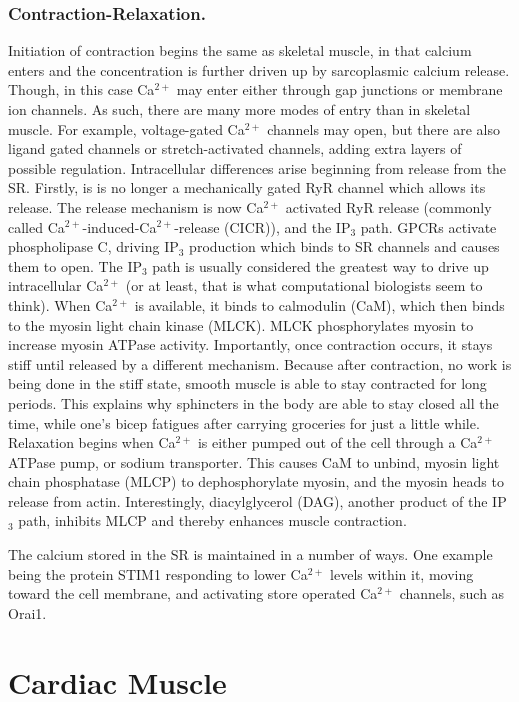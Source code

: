 \documentclass[12pt]{report}
\begin{document}
\subsubsection{Contraction-Relaxation.} 
Initiation of contraction begins the same as skeletal muscle, in that calcium enters and the concentration is further driven up by sarcoplasmic calcium release. Though, in this case Ca$^{2+}$ may enter either through gap junctions or membrane ion channels. As such, there are many more modes of entry than in skeletal muscle. For example, voltage-gated Ca$^{2+}$ channels may open, but there are also ligand gated channels or stretch-activated channels, adding extra layers of possible regulation. Intracellular differences arise beginning from release from the SR. Firstly, is is no longer a mechanically gated RyR channel which allows its release. The release mechanism is now Ca$^{2+}$ activated RyR release (commonly called Ca$^{2+}$-induced-Ca$^{2+}$-release (CICR)), and the IP$_3$ path. GPCRs activate phospholipase C, driving IP$_3$ production which binds to SR channels and causes them to open. The IP$_3$ path is usually considered the greatest way to drive up intracellular Ca$^{2+}$ (or at least, that is what computational biologists seem to think). When Ca$^{2+}$ is available, it binds to calmodulin (CaM), which then binds to the myosin light chain kinase (MLCK). MLCK phosphorylates myosin to increase myosin ATPase activity. Importantly, once contraction occurs, it stays stiff until released by a different mechanism. Because after contraction, no work is being done in the stiff state, smooth muscle is able to stay contracted for long periods. This explains why sphincters in the body are able to stay closed all the time, while one's bicep fatigues after carrying groceries for just a little while. Relaxation begins when Ca$^{2+}$ is either pumped out of the cell through a Ca$^{2+}$ATPase pump, or sodium transporter. This causes CaM to unbind, myosin light chain phosphatase (MLCP) to dephosphorylate myosin, and the myosin heads to release from actin. Interestingly, diacylglycerol (DAG), another product of the IP$_3$ path, inhibits MLCP and thereby enhances muscle contraction.\newline

The calcium stored in the SR is maintained in a number of ways. One example being the protein STIM1 responding to lower Ca$^{2+}$ levels within it, moving toward the cell membrane, and activating store operated Ca$^{2+}$ channels, such as Orai1. 

\section{Cardiac Muscle}
\end{document}
